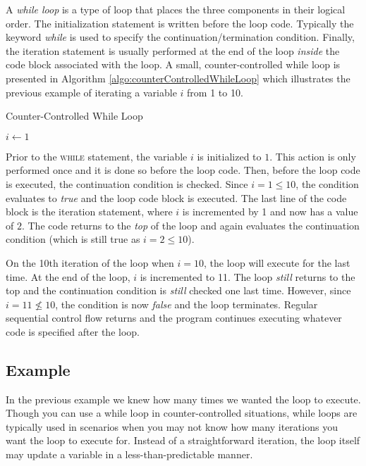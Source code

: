 A \emph{while loop} is a type of loop that places the three components in their 
logical order.  The initialization statement is written before the loop code.  
Typically the keyword \emph{while} is used to specify the continuation/termination
condition.  Finally, the iteration statement is usually performed at the end of the loop
\emph{inside} the code block associated with the loop.  A small, counter-controlled 
while loop is presented in Algorithm \ref{algo:counterControlledWhileLoop} which 
illustrates the previous example of iterating a variable $i$ from 1 to 10.

\begin{algorithm}[H]
\caption{Counter-Controlled While Loop}
\label{algo:counterControlledWhileLoop}
$i \leftarrow 1$ 
\end{algorithm}

Prior to the \textsc{while} statement, the variable $i$ is initialized to $1$.  This action
is only performed once and it is done so before the loop code.  Then, before the loop
code is executed, the continuation condition is checked.  Since $i = 1 \leq 10$, the 
condition evaluates to \emph{true} and the loop code block is executed.  The last
line of the code block is the iteration statement, where $i$ is incremented by 1 and
now has a value of $2$.  The code returns to the \emph{top} of the loop and again
evaluates the continuation condition (which is still true as $i = 2 \leq 10$).  

On the 10th iteration of the loop when $i = 10$, the loop will execute for the last
time.  At the end of the loop, $i$ is incremented to 11.  The loop \emph{still} returns
to the top and the continuation condition is \emph{still} checked one last time.  However,
since $i = 11 \not\leq 10$, the condition is now \emph{false} and the loop terminates.
Regular sequential control flow returns and the program continues executing whatever
code is specified after the loop.

\subsection{Example}
\label{subsection:whileLoopExample}

In the previous example we knew how many times we wanted the loop to execute.  
Though you can use a while loop in counter-controlled situations, while loops are 
typically used in scenarios when you may not know how many iterations you want 
the loop to execute for.  Instead of a straightforward iteration, the loop itself may
update a variable in a less-than-predictable manner.  

